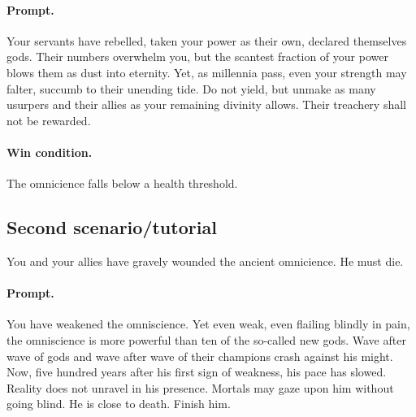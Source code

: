 \documentclass[12pt,letterpaper]{article}
\begin{document}
\paragraph{Prompt.}
Your servants have rebelled,
taken your power as their own,
declared themselves gods.
Their numbers overwhelm you,
but the scantest fraction of your power blows them as dust into eternity.
Yet, as millennia pass, even your strength may falter,
succumb to their unending tide.
Do not yield, but unmake as many usurpers and their allies
as your remaining divinity allows.
Their treachery shall not be rewarded.

%

\paragraph{Win condition.}
The omnicience falls below a health threshold.


\subsection{Second scenario/tutorial}
You and your allies have gravely wounded the ancient omnicience.
He must die.

\paragraph{Prompt.}
You have weakened the omniscience.
Yet even weak, even flailing blindly in pain,
the omniscience is more powerful than ten of the so-called new gods.
Wave after wave of gods and wave after wave of their champions
crash against his might.
Now, five hundred years after his first sign of weakness,
his pace has slowed.
Reality does not unravel in his presence.
Mortals may gaze upon him without going blind.
He is close to death.
Finish him.
\end{document}
